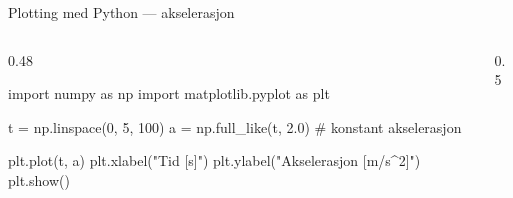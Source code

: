 \documentclass[aspectratio=169, 12pt]{beamer}
\begin{document}
\begin{frame}[fragile]{Plotting med Python --- akselerasjon}

  \begin{columns}[t]
    \begin{column}{0.48\textwidth}
\begin{pycode}
import numpy as np
import matplotlib.pyplot as plt

t = np.linspace(0, 5, 100)
a = np.full_like(t, 2.0)   # konstant akselerasjon

plt.plot(t, a)
plt.xlabel("Tid [s]")
plt.ylabel("Akselerasjon [m/s^2]")
plt.show()
\end{pycode}
    \end{column}
    \begin{column}{0.5\textwidth}
      \begin{center}
      \end{center}
    \end{column}
  \end{columns}

\end{frame}
\end{document}
